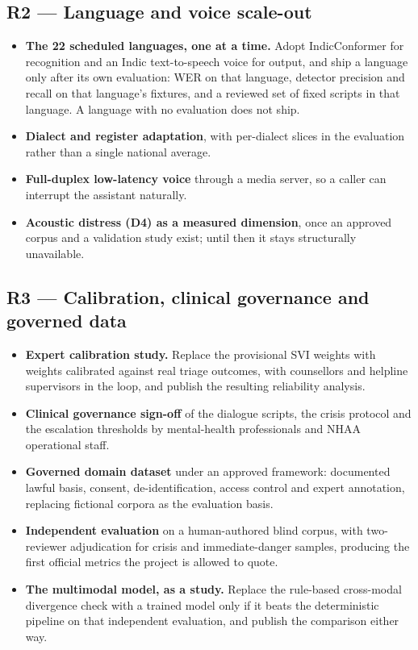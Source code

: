 \documentclass[11pt,a4paper]{article}
\begin{document}
\subsection{R2 --- Language and voice scale-out}
\begin{itemize}
  \item \textbf{The 22 scheduled languages, one at a time.} Adopt IndicConformer for recognition and
        an Indic text-to-speech voice for output, and ship a language only after its own evaluation:
        WER on that language, detector precision and recall on that language's fixtures, and a
        reviewed set of fixed scripts in that language. A language with no evaluation does not ship.
  \item \textbf{Dialect and register adaptation}, with per-dialect slices in the evaluation rather
        than a single national average.
  \item \textbf{Full-duplex low-latency voice} through a media server, so a caller can interrupt the
        assistant naturally.
  \item \textbf{Acoustic distress (D4) as a measured dimension}, once an approved corpus and a
        validation study exist; until then it stays structurally unavailable.
\end{itemize}

\subsection{R3 --- Calibration, clinical governance and governed data}
\begin{itemize}
  \item \textbf{Expert calibration study.} Replace the provisional SVI weights with weights
        calibrated against real triage outcomes, with counsellors and helpline supervisors in the
        loop, and publish the resulting reliability analysis.
  \item \textbf{Clinical governance sign-off} of the dialogue scripts, the crisis protocol and the
        escalation thresholds by mental-health professionals and NHAA operational staff.
  \item \textbf{Governed domain dataset} under an approved framework: documented lawful basis,
        consent, de-identification, access control and expert annotation, replacing fictional corpora
        as the evaluation basis.
  \item \textbf{Independent evaluation} on a human-authored blind corpus, with two-reviewer
        adjudication for crisis and immediate-danger samples, producing the first official metrics the
        project is allowed to quote.
  \item \textbf{The multimodal model, as a study.} Replace the rule-based cross-modal divergence check
        with a trained model only if it beats the deterministic pipeline on that independent
        evaluation, and publish the comparison either way.
\end{itemize}
\end{document}
